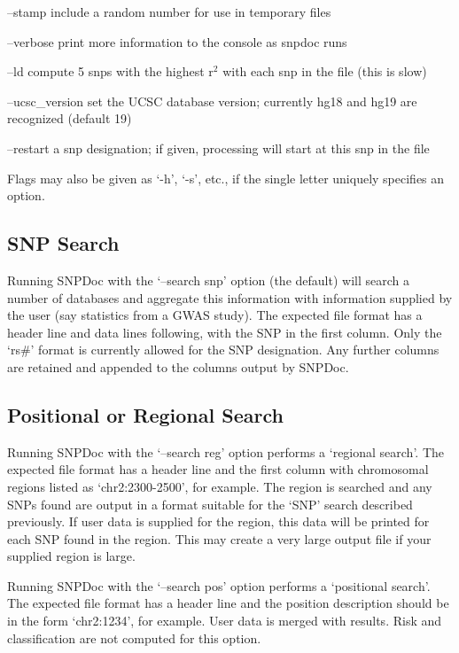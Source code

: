 \documentclass[11pt]{article}
\begin{document}
   --stamp         include a random number for use in temporary files

   --verbose       print more information to the console as snpdoc runs

   --ld            compute 5 snps with the highest r$^2$ with each snp in
                   the file (this is slow)

   --ucsc\_version set the UCSC database version; currently hg18 and hg19
                   are recognized (default 19)

   --restart       a snp designation; if given, processing will start at
                   this snp in the file

   Flags may also be given as `-h', `-s', etc., if the single letter uniquely
   specifies an option.
   
\subsection{SNP Search}
\label{sec-3_2}


   Running SNPDoc with the `--search snp' option (the default) will search a
   number of databases and aggregate this information with information supplied
   by the user (say statistics from a GWAS study).  The expected file format has
   a header line and data lines following, with the SNP in the first column.
   Only the `rs\#' format is currently allowed for the SNP designation.  Any
   further columns are retained and appended to the columns output by SNPDoc.
\subsection{Positional or Regional Search}
\label{sec-3_3}


   Running SNPDoc with the `--search reg' option performs a `regional search'.
   The expected file format has a header line and the first column with
   chromosomal regions listed as `chr2:2300-2500', for example.  The region is
   searched and any SNPs found are output in a format suitable for the `SNP'
   search described previously.  If user data is supplied for the region, this
   data will be printed for each SNP found in the region.  This may create a
   very large output file if your supplied region is large.

   Running SNPDoc with the `--search pos' option performs a `positional search'.
   The expected file format has a header line and the position description
   should be in the form `chr2:1234', for example.  User data is merged with
   results.  Risk and classification are not computed for this option.
\end{document}
